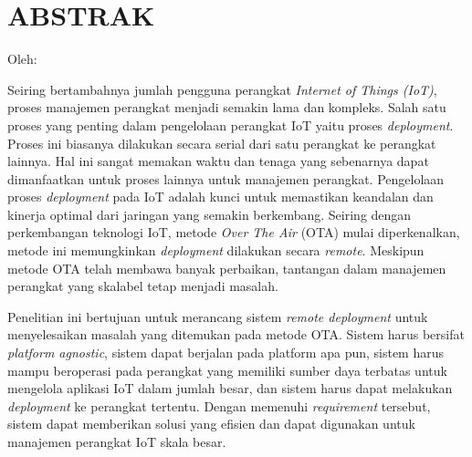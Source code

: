 \clearpage
\chapter*{ABSTRAK}
\begin{center}
  \center
  \begin{singlespace}
    \large\bfseries\MakeUppercase{\thetitle}
    
    \normalfont\normalsize
    Oleh:
    
    \bfseries \theauthor
  \end{singlespace}
\end{center}

\begin{singlespace}
  \small
  Seiring bertambahnya jumlah pengguna perangkat \textit{Internet of Things (IoT)}, proses manajemen perangkat menjadi semakin lama dan kompleks. Salah satu proses yang penting dalam pengelolaan perangkat IoT yaitu proses \textit{deployment}. Proses ini biasanya dilakukan secara serial dari satu perangkat ke perangkat lainnya. Hal ini sangat memakan waktu dan tenaga yang sebenarnya dapat dimanfaatkan untuk proses lainnya untuk manajemen perangkat. Pengelolaan proses \textit{deployment} pada IoT adalah kunci untuk memastikan keandalan dan kinerja optimal dari jaringan yang semakin berkembang. Seiring dengan perkembangan teknologi IoT, metode \textit{Over The Air} (OTA) mulai diperkenalkan, metode ini memungkinkan \textit{deployment} dilakukan secara \textit{remote}. Meskipun metode OTA telah membawa banyak perbaikan, tantangan dalam manajemen perangkat yang skalabel tetap menjadi masalah.
  
  Penelitian ini bertujuan untuk merancang sistem \textit{remote deployment} untuk menyelesaikan masalah yang ditemukan pada metode OTA. Sistem harus bersifat \textit{platform agnostic}, sistem dapat berjalan pada platform apa pun, sistem harus mampu beroperasi pada perangkat yang memiliki sumber daya terbatas untuk mengelola aplikasi IoT dalam jumlah besar, dan sistem harus dapat melakukan \textit{deployment} ke perangkat tertentu. Dengan memenuhi \textit{requirement} tersebut, sistem dapat memberikan solusi yang efisien dan dapat digunakan untuk manajemen perangkat IoT skala besar.
  

\end{singlespace}
